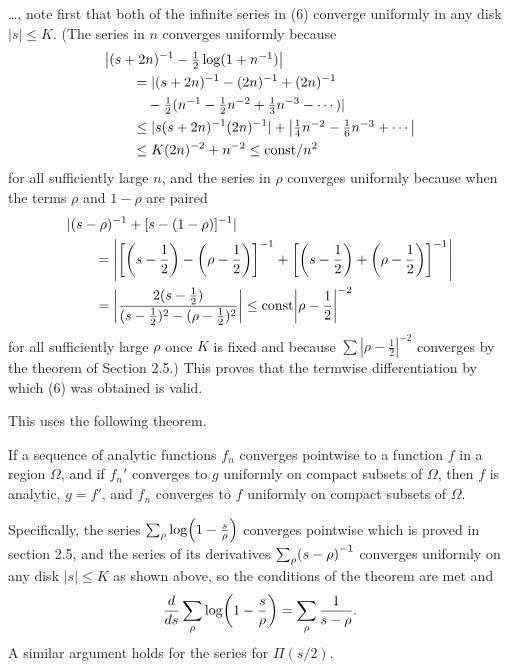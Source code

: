 \documentclass{note}
\numberwithin{equation}{chapter}
\begin{document}
\begin{quotebar}
    \dots, note first that both of the infinite series in (6) converge uniformly in
    any disk \( |s| \leq K \). (The series in \( n \) converges uniformly because
    \begin{align*}
         & \abs{(s + 2n)^{-1} - \textstyle\frac{1}{2} \log(1 + n^{-1})}      \\
         & \qquad = |(s + 2n)^{-1} - (2n)^{-1} + (2n)^{-1}                   \\
         & \qquad \quad - \textstyle\frac{1}{2}(n^{-1} - \frac{1}{2}n^{-2} +
        \frac{1}{3}n^{-3} - \cdots )|                                        \\
         & \qquad \leq |s(s + 2n)^{-1}(2n)^{-1}| + \textstyle \abs{
        \frac{1}{4}n^{-2} - \frac{1}{6}n^{-3} + \cdots}                      \\
         & \qquad \leq K(2n)^{-2} + n^{-2} \leq \text{const}/n^2
    \end{align*}
    for all sufficiently large \( n \), and the series in \( \rho \) converges
    uniformly because when the terms \( \rho \) and \( 1 - \rho \) are paired
    \begin{align*}
         & |(s - \rho)^{-1} + [s - (1 - \rho)]^{-1}|                          \\
         & \qquad = \left| \left[\prn{s - \frac{1}{2}} - \prn{\rho -
                \frac{1}{2}}\right]^{-1} + \left[\prn{s - \frac{1}{2}} +
        \prn{\rho - \frac{1}{2}}\right]^{-1} \right|                          \\
         & \qquad = \left\lvert \frac{2(s - \frac{1}{2})}{(s - \frac{1}{2})^2
            - (\rho - \frac{1}{2})^2} \right\rvert
        \leq \text{const} \left\lvert \rho - \frac{1}{2} \right\rvert^{-2}
    \end{align*}
    for all sufficiently large \( \rho \) once \( K \) is fixed and because \( \sum
    |\rho - \frac{1}{2}|^{-2} \) converges by the theorem of Section 2.5.) This
    proves that the termwise differentiation by which (6) was obtained is valid.
\end{quotebar}

This uses the following theorem.
\begin{theorem*}
    If a sequence of analytic functions \( f_n
    \) converges pointwise to a function \( f \) in a region \( \Omega \), and if
    \( f_n' \) converges to \( g \) uniformly on compact subsets of \( \Omega \),
    then \( f \) is analytic, \( g = f' \), and \( f_n \) converges to \( f \)
    uniformly on compact subsets of \( \Omega \).
\end{theorem*}

Specifically, the series $\sum_\rho\log\prn{1 - \frac{s}{\rho}}$ converges
pointwise which is proved in section 2.5, and the series of its derivatives
$\sum_\rho\prn{s - \rho}^{-1}$ converges uniformly on any disk $|s| \leq K$ as
shown above, so the conditions of the theorem are met and
\begin{equation*}
    \frac{d}{ds} \sum_\rho\log\prn{1 - \frac{s}{\rho}} = \sum_\rho\frac{1}{s -
        \rho}.
\end{equation*}
A similar argument holds for the series for $\Pi(s/2)$.
\end{document}
